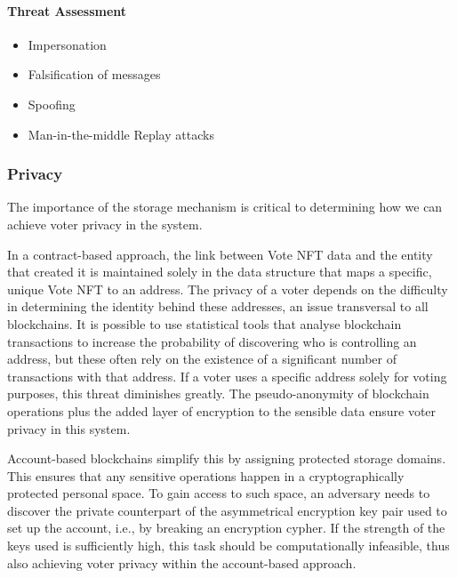 \documentclass[../main.tex]{subfiles}
\begin{document}
\paragraph{Threat Assessment}
\begin{itemize}

    \item{Impersonation}

    \item{Falsification of messages}

    \item{Spoofing}

    \item{Man-in-the-middle Replay attacks}

\end{itemize}

\subsubsection{Privacy}
\label{voter_privacy}
The importance of the storage mechanism is critical to determining how we can achieve voter privacy in the system.
\par
In a contract-based approach, the link between Vote NFT data and the entity that created it is maintained solely in the data structure that maps a specific, unique Vote NFT to an address. The privacy of a voter depends on the difficulty in determining the identity behind these addresses, an issue transversal to all blockchains. It is possible to use statistical tools that analyse blockchain transactions to increase the probability of discovering who is controlling an address, but these often rely on the existence of a significant number of transactions with that address. If a voter uses a specific address solely for voting purposes, this threat diminishes greatly. The pseudo-anonymity of blockchain operations plus the added layer of encryption to the sensible data ensure voter privacy in this system.
\par
Account-based blockchains simplify this by assigning protected storage domains. This ensures that any sensitive operations happen in a cryptographically protected personal space. To gain access to such space, an adversary needs to discover the private counterpart of the asymmetrical encryption key pair used to set up the account, i.e., by breaking an encryption cypher. If the strength of the keys used is sufficiently high, this task should be computationally infeasible, thus also achieving voter privacy within the account-based approach.
\end{document}
